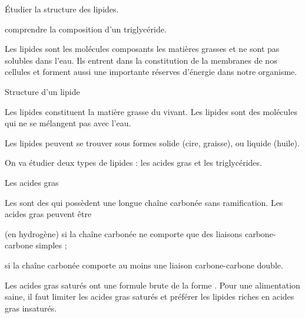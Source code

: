 \tetePremStssBiol
\vspace*{-36pt}

\begin{objectifs}
  \item Étudier la structure des lipides.
  \item comprendre la composition d'un triglycéride.
\end{objectifs}

\begin{contexte}
  Les lipides sont les molécules composants les matières grasses et ne sont pas solubles dans l'eau.
  Ils entrent dans la constitution de la membranes de nos cellules et forment aussi une importante réserves d'énergie dans notre organisme.

\end{contexte}


\begin{doc}{Structure d'un lipide}
  \begin{importants}
    Les lipides constituent la matière grasse du vivant.
    Les lipides sont des molécules  qui ne se mélangent pas avec l'eau.
  \end{importants}
  Les lipides peuvent se trouver sous formes solide (cire, graisse), ou liquide (huile).
  
  On va étudier deux types de lipides : les acides gras et les triglycérides.
\end{doc}

\begin{doc}{Les acides gras}
  \begin{importants}
    Les  sont des  qui possèdent une longue chaîne carbonée sans ramification.
    Les acides gras peuvent être 
    \begin{listePoints}
      \item {} (en hydrogène) si la chaîne carbonée ne comporte que des liaisons carbone-carbone simples ;
      \item {} si la chaîne carbonée comporte au moins une liaison carbone-carbone double.
    \end{listePoints}
  \end{importants}
  
  \begin{multicols}{2}
    \centering

  \end{multicols}
  \vspace*{-8pt}
  Les acides gras saturés ont une formule brute de la forme .
  Pour une alimentation saine, il faut limiter les acides gras saturés et préférer les lipides riches en acides gras insaturés.
\end{doc}

